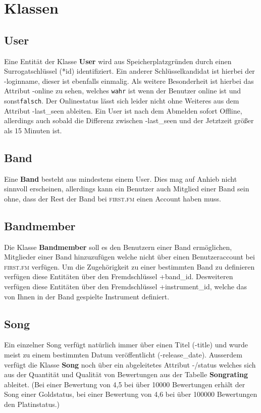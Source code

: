 \documentclass[11pt,a4paper,DIV=9]{scrartcl}
\begin{document}
\section{Klassen}
  \subsection{User}
    Eine Entität der Klasse \textbf{User} wird aus Speicherplatzgründen durch einen Surrogatschlüssel (*id) identifiziert. Ein anderer Schlüsselkandidat ist hierbei der -loginname, dieser ist ebenfalls einmalig. Als weitere Besonderheit ist hierbei das Attribut -online zu sehen, welches \texttt{wahr} ist wenn der Benutzer online ist und sonst\texttt{falsch}. Der Onlinestatus lässt sich leider nicht ohne Weiteres aus dem Attribut -last\_seen ableiten. Ein User ist nach dem Abmelden sofort Offline, allerdings auch sobald die Differenz zwischen -last\_seen und der Jetztzeit größer als 15 Minuten ist.
  \subsection{Band}
    Eine \textbf{Band} besteht aus mindestens einem User. Dies mag auf Anhieb nicht sinnvoll erscheinen, allerdings kann ein Benutzer auch Mitglied einer Band sein ohne, dass der Rest der Band bei \textsc{first.fm} einen Account haben muss. 
  \subsection{Bandmember}
    Die Klasse \textbf{Bandmember} soll es den Benutzern einer Band ermöglichen, Mitglieder einer Band hinzuzufügen welche nicht über einen Benutzeraccount bei \textsc{first.fm} verfügen. Um die Zugehörigkeit zu einer bestimmten Band zu definieren verfügen diese Entitäten über den Fremdschlüssel +band\_id. Desweiteren verfügen diese Entitäten über den Fremdschlüssel +instrument\_id, welche das von Ihnen in der Band gespielte Instrument definiert.
  \subsection{Song}
    Ein einzelner Song verfügt natürlich immer über einen Titel (-title) und wurde meist zu einem bestimmten Datum veröffentlicht (-release\_date). Ausserdem verfügt die Klasse \textbf{Song} noch über ein abgeleitetes Attribut -/status welches sich aus der Quantität und Qualität von Bewertungen aus der Tabelle \textbf{Songrating} ableitet. (Bei einer Bewertung von 4,5 bei \"uber 10000 Bewertungen erh\"alt der Song einer Goldstatus, bei einer Bewertung von 4,6 bei \"uber 100000 Bewertungen den Platinstatus.) 
\end{document}
